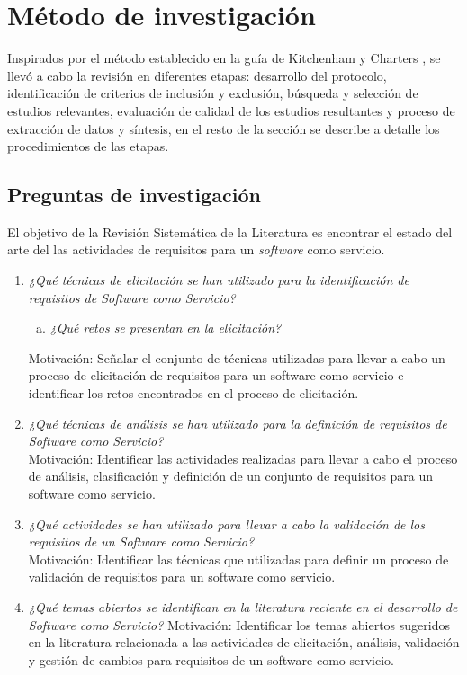 \documentclass[conference,onecolumn,10pt]{IEEEtran}
\begin{document}
\section{Método de investigación}
Inspirados por el método establecido en la guía de Kitchenham y Charters \cite{kitchenham2007guidelines}, 
se llevó a cabo la revisión en diferentes etapas: desarrollo del protocolo, identificación de criterios de 
inclusión y exclusión, búsqueda y selección de estudios relevantes, evaluación de calidad de los estudios 
resultantes y proceso de extracción de datos y síntesis, en el resto de la sección se describe a 
detalle los procedimientos de las etapas. 

\subsection{Preguntas de investigación}
El objetivo de la Revisión Sistemática de la Literatura es encontrar el estado del arte del las actividades de requisitos para un \emph{software} como servicio. 

\begin{enumerate}[P 1.-]
  \item\emph{¿Qué técnicas de elicitación se han utilizado para la identificación de requisitos de Software como Servicio?}
  \begin{enumerate}[(a)]
  \item \emph{¿Qué retos se presentan en la elicitación?}
  \end{enumerate}
  Motivación: Señalar el conjunto de técnicas utilizadas para llevar a cabo un proceso de elicitación de requisitos para un software como servicio e identificar los retos encontrados en el proceso de elicitación. 
  
  \item\emph{¿Qué técnicas de análisis se han utilizado para la definición de requisitos de Software como Servicio?}\\
  Motivación: Identificar las actividades realizadas para llevar a cabo el proceso de análisis, clasificación y definición de un conjunto de requisitos para un software como servicio.

  \item\emph{¿Qué actividades se han utilizado para llevar a cabo la validación de los requisitos de un Software como Servicio?}\\
  Motivación: Identificar las técnicas que utilizadas para definir un proceso de validación de requisitos para un software como servicio.

  \item\emph{¿Qué temas abiertos se identifican en la literatura reciente en el desarrollo de Software como Servicio?}
  Motivación: Identificar los temas abiertos sugeridos en la literatura relacionada a las actividades de elicitación, análisis, validación y gestión de cambios 
 para requisitos de un software como servicio.
\end{enumerate}
\end{document}
